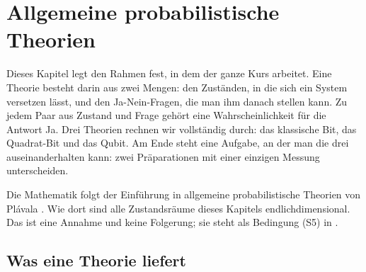 %
%

\chapter{Allgemeine probabilistische Theorien}\label{c02}

Dieses Kapitel legt den Rahmen fest, in dem der ganze Kurs arbeitet. Eine Theorie besteht
darin aus zwei Mengen: den Zuständen, in die sich ein System versetzen lässt, und den
Ja-Nein-Fragen, die man ihm danach stellen kann. Zu jedem Paar aus Zustand und Frage gehört
eine Wahrscheinlichkeit für die Antwort Ja. Drei Theorien rechnen wir vollständig durch: das
klassische Bit, das Quadrat-Bit und das Qubit. Am Ende steht eine Aufgabe, an der man die
drei auseinanderhalten kann: zwei Präparationen mit einer einzigen Messung unterscheiden.

Die Mathematik folgt der Einführung in allgemeine probabilistische Theorien von Plávala
.
Wie dort sind alle Zustandsräume dieses Kapitels endlichdimensional. Das ist eine Annahme
und keine Folgerung; sie steht als Bedingung (S5) in .

\section{Was eine Theorie liefert}\label{c02.s1}

